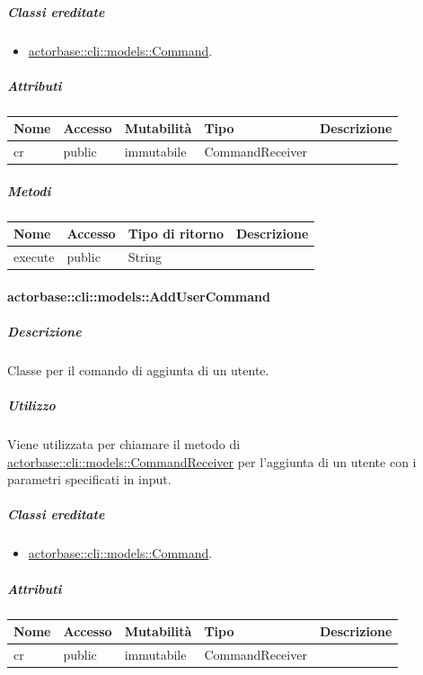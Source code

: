 \documentclass{scalatekids-article}
\begin{document}
\subparagraph{Classi ereditate}

\begin{itemize}
\item \hyperref[sec:actorbase::cli::models::Command]{actorbase::cli::models::Command}.
\end{itemize}

\subparagraph{Attributi}

\begin{tabular}{| l | l | l | l | l |}
  \hline
  Nome & Accesso & Mutabilità & Tipo & Descrizione\\
  \hline
  cr & public & immutabile & CommandReceiver & \\
  \hline
\end{tabular}

\subparagraph{Metodi}

\begin{tabular}{| l | l | l | l |}
  \hline
  Nome & Accesso & Tipo di ritorno & Descrizione\\
  \hline
  execute & public & String & \\
  \hline
\end{tabular}

\paragraph{actorbase::cli::models::AddUserCommand}
\label{sec:actorbase::cli::models::AddUserCommand}

\subparagraph{Descrizione}

Classe per il comando di aggiunta di un utente.

\subparagraph{Utilizzo}

Viene utilizzata per chiamare il metodo di
\hyperref[sec:actorbase::cli::models::CommandReceiver]{actorbase::cli::models::CommandReceiver} per l'aggiunta di un utente con i
parametri specificati in input.

\subparagraph{Classi ereditate}

\begin{itemize}
\item \hyperref[sec:actorbase::cli::models::Command]{actorbase::cli::models::Command}.
\end{itemize}

\subparagraph{Attributi}

\begin{tabular}{| l | l | l | l | l |}
  \hline
  Nome & Accesso & Mutabilità & Tipo & Descrizione\\
  \hline
  cr & public & immutabile & CommandReceiver & \\
  \hline
\end{tabular}
\end{document}
